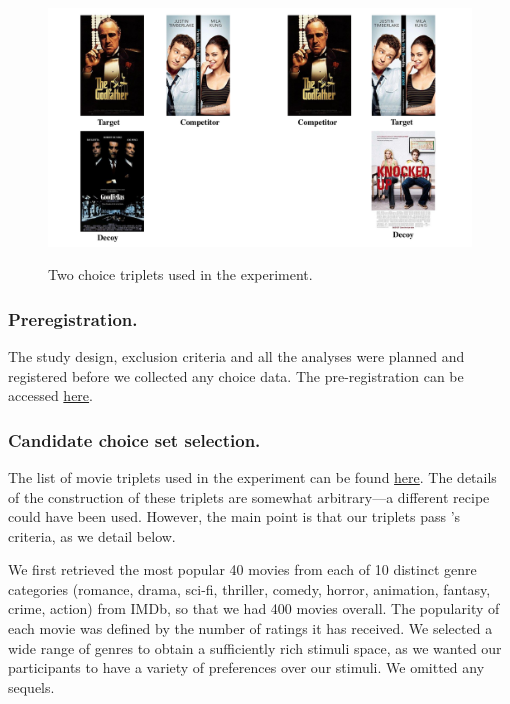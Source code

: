 \documentclass[12pt, a4paper]{article}
\begin{document}
\begin{figure}
\centering
		 \caption{Two choice triplets used in the experiment.}
\includegraphics[width=1\textwidth]{figure1.pdf}
\label{fig:quadruplets}
\end{figure}

\subsubsection*{Preregistration.}
The study design, exclusion criteria and all the analyses were planned and registered before we collected any choice data. The pre-registration can be accessed \href{https://osf.io/fme6c/?view_only=31da4193689f4247a76af93b2f98fcef}{here}.

\subsubsection*{Candidate choice set selection.}

The list of movie triplets used in the experiment can be found \href{https://osf.io/fme6c/?view_only=31da4193689f4247a76af93b2f98fcef}{here}. The details of the construction of these triplets are somewhat arbitrary---a different recipe could have been used. However, the main point is that our triplets pass \citeauthor{Huber2014}'s \citeyear{Huber2014} criteria, as we detail below.

We first retrieved the most popular 40 movies from each of 10 distinct genre categories (romance, drama, sci-fi, thriller, comedy, horror, animation, fantasy, crime, action) from IMDb, so that we had 400 movies overall. The popularity of each movie was defined by the number of ratings it has received. We selected a wide range of genres to obtain a sufficiently rich stimuli space, as we wanted our participants to have a variety of preferences over our stimuli. We omitted any sequels.
\end{document}

